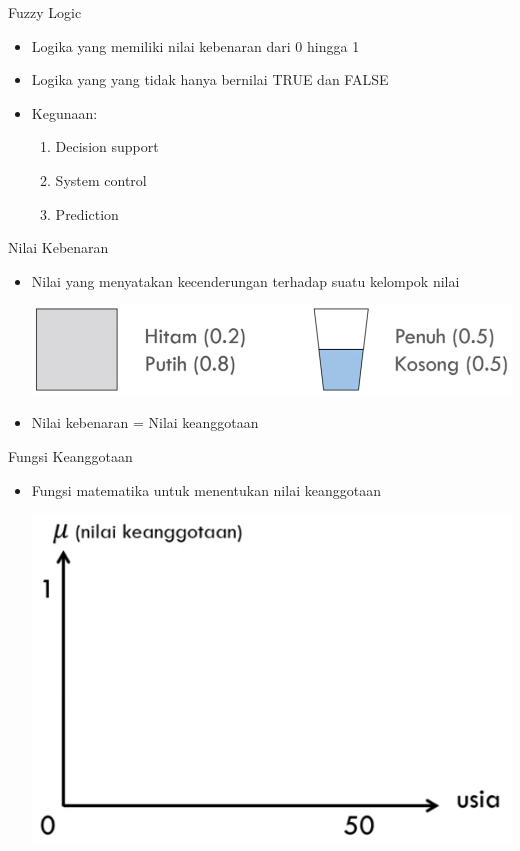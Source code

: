 \documentclass[pdflatex,compress,mathserif]{beamer}
\begin{document}
\begin{frame}{Fuzzy Logic}
	\begin{itemize}
		\item Logika yang memiliki nilai kebenaran dari 0 hingga 1
		\item Logika yang yang tidak hanya bernilai TRUE dan FALSE
		\item Kegunaan:
		\begin{enumerate}
			\item Decision support
			\item System control
			\item Prediction
		\end{enumerate}
	\end{itemize}
\end{frame}

\begin{frame}{Nilai Kebenaran}
	\begin{itemize}
		\item Nilai yang menyatakan kecenderungan terhadap suatu kelompok nilai
		\begin{center}
			\includegraphics[width=0.6\linewidth]{img/05}
		\end{center}
		\item Nilai kebenaran = Nilai keanggotaan
	\end{itemize}
\end{frame}

\begin{frame}{Fungsi Keanggotaan}
	\begin{itemize}
		\item Fungsi matematika untuk menentukan nilai keanggotaan
		\begin{center}
			\includegraphics[width=0.5\linewidth]{img/06}
		\end{center}
	\end{itemize}
\end{frame}
\end{document}

